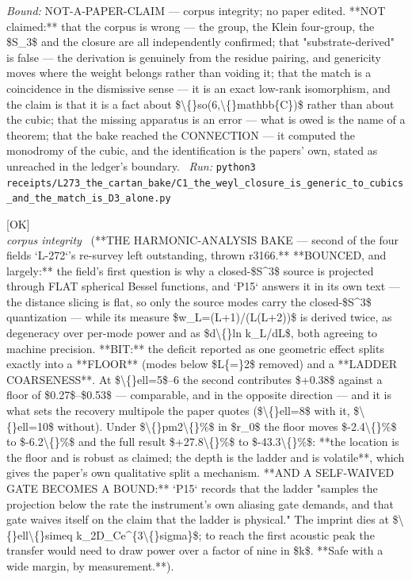 \begin{description}
 \emph{Bound:} NOT-A-PAPER-CLAIM --- corpus integrity; no paper edited. **NOT claimed:** that the corpus is wrong --- the group, the Klein four-group, the \$S\_3\$ and the closure are all independently confirmed; that "substrate-derived" is false --- the derivation is genuinely from the residue pairing, and genericity moves where the weight belongs rather than voiding it; that the match is a coincidence in the dismissive sense --- it is an exact low-rank isomorphism, and the claim is that it is a fact about \$\textbackslash\{\}so(6,\textbackslash\{\}mathbb\{C\})\$ rather than about the cubic; that the missing apparatus is an error --- what is owed is the name of a theorem; that the bake reached the CONNECTION --- it computed the monodromy of the cubic, and the identification is the papers' own, stated as unreached in the ledger's boundary.
\ \emph{Run:} \texttt{python3 receipts/L273\_the\_cartan\_bake/C1\_the\_weyl\_closure\_is\_generic\_to\_cubics\_and\_the\_match\_is\_D3\_alone.py}
\item[\label{rcpt:H1_the_low_multipole_deficit_is_two_effects_and_the_ladder_imprint_dies_where_the_transfer_is_narrow}\texttt{H1\_the\_low\_multipole\_deficit\_is\_two\_effects\_and\_the\_ladder\_imprint\_dies\_where\_the\_transfer\_is\_narrow}]\hfill\textsf{[OK]}\\
\textit{corpus integrity} \ (**THE HARMONIC-ANALYSIS BAKE --- second of the four fields `L-272`'s re-survey left outstanding, thrown r3166.** **BOUNCED, and largely:** the field's first question is why a closed-\$S\textasciicircum{}3\$ source is projected through FLAT spherical Bessel functions, and `P15` answers it in its own text --- the distance slicing is flat, so only the source modes carry the closed-\$S\textasciicircum{}3\$ quantization --- while its measure \$w\_L=(L+1)/(L(L+2))\$ is derived twice, as degeneracy over per-mode power and as \$d\textbackslash\{\}ln k\_L/dL\$, both agreeing to machine precision. **BIT:** the deficit reported as one geometric effect splits exactly into a **FLOOR** (modes below \$L\{=\}2\$ removed) and a **LADDER COARSENESS**. At \$\textbackslash\{\}ell=5\$--6 the second contributes \$+0.38\$ against a floor of \$0.27\$--\$0.53\$ --- comparable, and in the opposite direction --- and it is what sets the recovery multipole the paper quotes (\$\textbackslash\{\}ell=8\$ with it, \$\textbackslash\{\}ell=10\$ without). Under \$\textbackslash\{\}pm2\textbackslash\{\}\%\$ in \$r\_0\$ the floor moves \$-2.4\textbackslash\{\}\%\$ to \$-6.2\textbackslash\{\}\%\$ and the full result \$+27.8\textbackslash\{\}\%\$ to \$-43.3\textbackslash\{\}\%\$: **the location is the floor and is robust as claimed; the depth is the ladder and is volatile**, which gives the paper's own qualitative split a mechanism. **AND A SELF-WAIVED GATE BECOMES A BOUND:** `P15` records that the ladder "samples the projection below the rate the instrument's own aliasing gate demands, and that gate waives itself on the claim that the ladder is physical." The imprint dies at \$\textbackslash\{\}ell\textbackslash\{\}simeq k\_2D\_Ce\textasciicircum{}\{3\textbackslash\{\}sigma\}\$; to reach the first acoustic peak the transfer would need to draw power over a factor of nine in \$k\$. **Safe with a wide margin, by measurement.**). 

\end{description}
